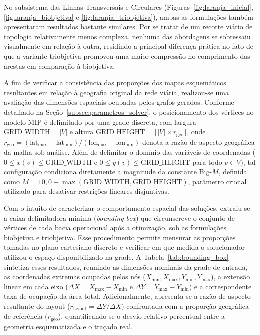 \documentclass[cic,tc]{infufrgs}
\begin{document}
No subsistema das Linhas Transversais e Circulares (Figuras~\ref{fig:laranja_inicial}, \ref{fig:laranja_biobjetiva} e \ref{fig:laranja_triobjetiva}), ambas as formulações também apresentaram resultados bastante similares. Por se tratar de um recorte viário de topologia relativamente menos complexa, nenhuma das abordagens se sobressaiu visualmente em relação à outra, residindo a principal diferença prática no fato de que a variante triobjetiva promoveu uma maior compressão no comprimento das arestas em comparação à biobjetiva.

A fim de verificar a consistência das proporções dos mapas esquemáticos resultantes em relação à geografia original da rede viária, realizou-se uma avaliação das dimensões espaciais ocupadas pelos grafos gerados. Conforme detalhado na Seção~\ref{subsec:parametros_solver}, o posicionamento dos vértices no modelo MIP é delimitado por uma grade discreta, com largura $\text{GRID\_WIDTH} = |V|$ e altura $\text{GRID\_HEIGHT} = \lfloor |V| \times r_{\text{geo}} \rfloor$, onde $r_{\text{geo}} = (\text{lat}_{\max} - \text{lat}_{\min}) / (\text{lon}_{\max} - \text{lon}_{\min})$ denota a razão de aspecto geográfica da malha sob análise. Além de delimitar o domínio das variáveis de coordenadas ($0 \le x(v) \le \text{GRID\_WIDTH}$ e $0 \le y(v) \le \text{GRID\_HEIGHT}$ para todo $v \in V$), tal configuração condiciona diretamente a magnitude da constante Big-$M$, definida como $M = 10{,}0 + \max(\text{GRID\_WIDTH}, \text{GRID\_HEIGHT})$, parâmetro crucial utilizado para desativar restrições lineares disjuntivas.

Com o intuito de caracterizar o comportamento espacial das soluções, extraiu-se a caixa delimitadora mínima (\textit{bounding box}) que circunscreve o conjunto de vértices de cada bacia operacional após a otimização, sob as formulações biobjetiva e triobjetiva. Esse procedimento permite mensurar as proporções tomadas no plano cartesiano discreto e verificar em que medida o solucionador utilizou o espaço disponibilizado na grade. A Tabela~\ref{tab:bounding_box} sintetiza esses resultados, reunindo as dimensões nominais da grade de entrada, as coordenadas extremas ocupadas pelos nós ($X_{\min}, X_{\max}, Y_{\min}, Y_{\max}$), a extensão linear em cada eixo ($\Delta X = X_{\max} - X_{\min}$ e $\Delta Y = Y_{\max} - Y_{\min}$) e a correspondente taxa de ocupação da área total. Adicionalmente, apresenta-se a razão de aspecto resultante do layout ($r_{\text{layout}} = \Delta Y / \Delta X$) confrontada com a proporção geográfica de referência ($r_{\text{geo}}$), quantificando-se o desvio relativo percentual entre a geometria esquematizada e o traçado real.
\end{document}
